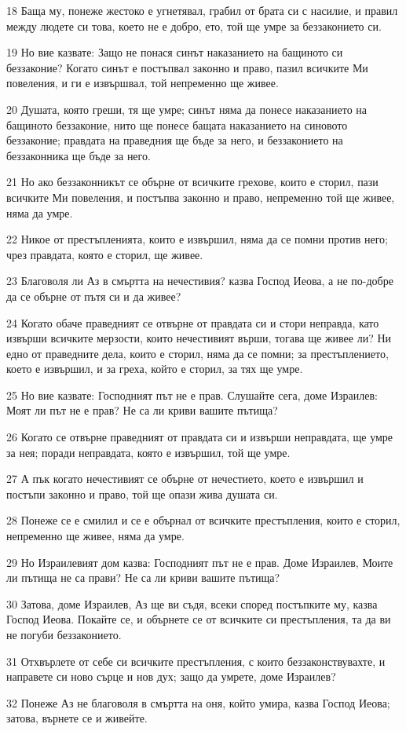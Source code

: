 \par 18 Баща му, понеже жестоко е угнетявал, грабил от брата си с насилие, и правил между людете си това, което не е добро, ето, той ще умре за беззаконието си.
\par 19 Но вие казвате: Защо не понася синът наказанието на бащиното си беззаконие? Когато синът е постъпвал законно и право, пазил всичките Ми повеления, и ги е извършвал, той непременно ще живее.
\par 20 Душата, която греши, тя ще умре; синът няма да понесе наказанието на бащиното беззаконие, нито ще понесе бащата наказанието на синовото беззаконие; правдата на праведния ще бъде за него, и беззаконието на беззаконника ще бъде за него.
\par 21 Но ако беззаконникът се обърне от всичките грехове, които е сторил, пази всичките Ми повеления, и постъпва законно и право, непременно той ще живее, няма да умре.
\par 22 Никое от престъпленията, които е извършил, няма да се помни против него; чрез правдата, която е сторил, ще живее.
\par 23 Благоволя ли Аз в смъртта на нечестивия? казва Господ Иеова, а не по-добре да се обърне от пътя си и да живее?
\par 24 Когато обаче праведният се отвърне от правдата си и стори неправда, като извърши всичките мерзости, които нечестивият върши, тогава ще живее ли? Ни едно от праведните дела, които е сторил, няма да се помни; за престъплението, което е извършил, и за греха, който е сторил, за тях ще умре.
\par 25 Но вие казвате: Господният път не е прав. Слушайте сега, доме Израилев: Моят ли път не е прав? Не са ли криви вашите пътища?
\par 26 Когато се отвърне праведният от правдата си и извърши неправдата, ще умре за нея; поради неправдата, която е извършил, той ще умре.
\par 27 А пък когато нечестивият се обърне от нечестието, което е извършил и постъпи законно и право, той ще опази жива душата си.
\par 28 Понеже се е смилил и се е обърнал от всичките престъпления, които е сторил, непременно ще живее, няма да умре.
\par 29 Но Израилевият дом казва: Господният път не е прав. Доме Израилев, Моите ли пътища не са прави? Не са ли криви вашите пътища?
\par 30 Затова, доме Израилев, Аз ще ви съдя, всеки според постъпките му, казва Господ Иеова. Покайте се, и обърнете се от всичките си престъпления, та да ви не погуби беззаконието.
\par 31 Отхвърлете от себе си всичките престъпления, с които беззаконствувахте, и направете си ново сърце и нов дух; защо да умрете, доме Израилев?
\par 32 Понеже Аз не благоволя в смъртта на оня, който умира, казва Господ Иеова; затова, върнете се и живейте.

